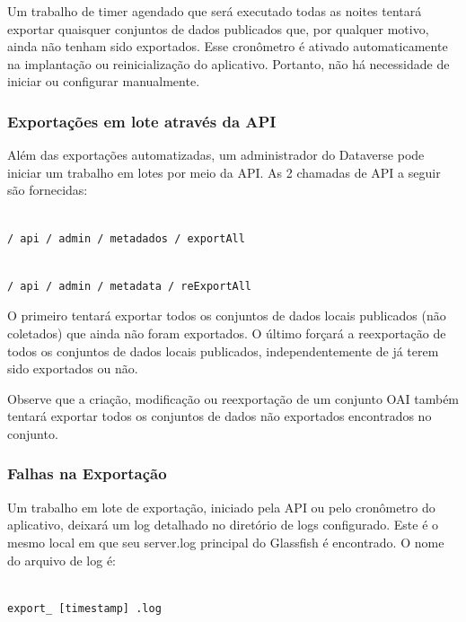 \documentclass[12pt,hidelinks]{article}
\begin{document}
Um trabalho de timer agendado que será executado todas as noites tentará exportar quaisquer conjuntos de dados publicados que, por qualquer motivo, ainda não tenham sido exportados. Esse cronômetro é ativado automaticamente na implantação ou reinicialização do aplicativo. Portanto, não há necessidade de iniciar ou configurar manualmente.

\subsubsection{Exportações em lote através da API}

\qquad Além das exportações automatizadas, um administrador do Dataverse pode iniciar um trabalho em lotes por meio da API. As 2 chamadas de API a seguir são fornecidas:

\begin{verbatim}

/ api / admin / metadados / exportAll

\end{verbatim}

\begin{verbatim}

/ api / admin / metadata / reExportAll

\end{verbatim}

O primeiro tentará exportar todos os conjuntos de dados locais publicados (não coletados) que ainda não foram exportados. O último forçará a reexportação de todos os conjuntos de dados locais publicados, independentemente de já terem sido exportados ou não.

Observe que a criação, modificação ou reexportação de um conjunto OAI também tentará exportar todos os conjuntos de dados não exportados encontrados no conjunto.

\subsubsection{Falhas na Exportação}

\qquad Um trabalho em lote de exportação, iniciado pela API ou pelo cronômetro do aplicativo, deixará um log detalhado no diretório de logs configurado. Este é o mesmo local em que seu server.log principal do Glassfish é encontrado. O nome do arquivo de log é:

\begin{verbatim}

export_ [timestamp] .log

\end{verbatim}
\end{document}

